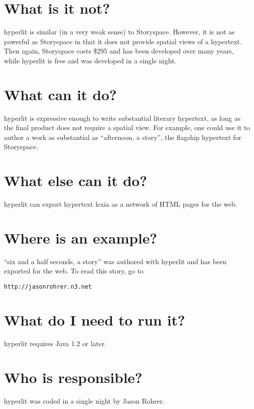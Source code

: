 \documentclass[12pt]{article}
\begin{document}
\section{What is it not?}
hyperlit is similar (in a very weak sense) to Storyspace.  However, it is not as powerful as Storyspace in that it does not provide spatial views of a hypertext.  Then again, Storyspace costs \$295 and has been developed over many years, while hyperlit is free and was developed in a single night.

\section{What can it do?}
hyperlit is expressive enough to write substantial literary hypertext, as long as the final product does not require a spatial view.  For example, one could use it to author a work as substantial as ``afternoon, a story'', the flagship hypertext for Storyspace.

\section{What else can it do?}
hyperlit can export hypertext lexia as a network of HTML pages for the web.

\section{Where is an example?}
``six and a half seconds, a story'' was authored with hyperlit and has been exported for the web.  To read this story, go to
\begin{center}
{\tt http://jasonrohrer.n3.net}
\end{center}

\section{What do I need to run it?}
hyperlit requires Java 1.2 or later.

\section{Who is responsible?}
hyperlit was coded in a single night by Jason Rohrer.

\end{document}
